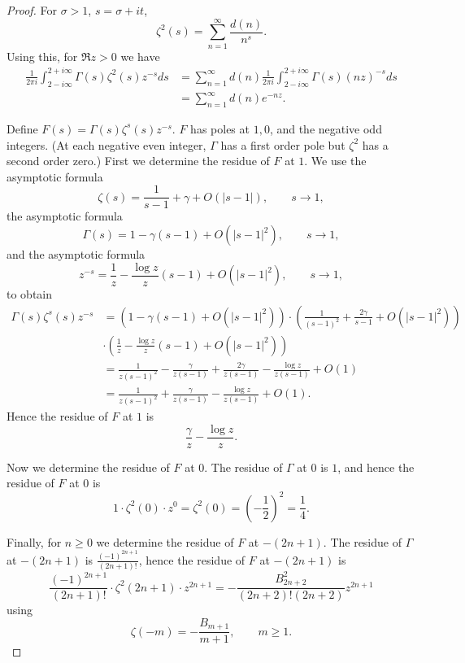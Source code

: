 \documentclass{article}
\begin{document}
\begin{proof}
For $\sigma>1$, $s=\sigma+it$,
\[
\zeta^2(s) = \sum_{n=1}^\infty \frac{d(n)}{n^s}.
\]
Using this, for
 $\Re z>0$ we have
\begin{align}
\frac{1}{2\pi i}\int_{2-i\infty}^{2+i\infty}
\Gamma(s) \zeta^2(s) z^{-s} ds & = \sum_{n=1}^\infty d(n) \frac{1}{2\pi i} \int_{2-i\infty}^{2+i\infty}
\Gamma(s) (nz)^{-s} ds
\nonumber \\
& = \sum_{n=1}^\infty d(n) e^{-nz}.
\label{mellin}
\end{align}

Define $F(s) = \Gamma(s) \zeta^s(s) z^{-s}$. $F$ has poles at
$1,0$, and the negative odd integers. (At each negative even integer, $\Gamma$ has a first order pole but $\zeta^2$ has a second order
zero.) First we determine the residue of $F$ at $1$.
We use the asymptotic formula
\[
\zeta(s) = \frac{1}{s-1}+\gamma+O(|s-1|), \qquad s \to 1,
\]
the asymptotic formula
\[
\Gamma(s)=1-\gamma(s-1)+O(|s-1|^2), \qquad s \to 1,
\]
and  the asymptotic formula
\[
z^{-s} = \frac{1}{z}-\frac{\log z}{z} (s-1)+O(|s-1|^2), \qquad  s \to 1,
\]
to obtain
\begin{align*}
 \Gamma(s) \zeta^s(s) z^{-s} &=(1-\gamma(s-1)+O(|s-1|^2)  )
\cdot \left(\frac{1}{(s-1)^2}+\frac{2\gamma}{s-1}+O(|s-1|^2)\right)\\
&\cdot \left( \frac{1}{z}-\frac{\log z}{z} (s-1)+O(|s-1|^2) \right)\\
&=\frac{1}{z(s-1)^2}
-\frac{\gamma}{z(s-1)}+\frac{2\gamma}{z(s-1)}-\frac{\log z}{z(s-1)}+O(1)\\
&=\frac{1}{z(s-1)^2}+\frac{\gamma}{z(s-1)}-\frac{\log z}{z(s-1)}+O(1).
\end{align*}
Hence the residue of $F$ at $1$ is 
\[
\frac{\gamma}{z}-\frac{\log z}{z}.
\]

Now we determine the residue of $F$ at $0$. The residue of $\Gamma$ at $0$ is $1$, and 
hence the residue of $F$ at $0$ is 
\[
1 \cdot \zeta^2(0) \cdot z^0 = \zeta^2(0) = \left( -\frac{1}{2} \right)^2 = \frac{1}{4}.
\]

Finally, for $n \geq 0$ we determine the residue of $F$ at $-(2n+1)$. The residue of $\Gamma$ at $-(2n+1)$ is
$\frac{(-1)^{2n+1}}{(2n+1)!}$, hence the residue of $F$ at $-(2n+1)$ is
\[
\frac{(-1)^{2n+1}}{(2n+1)!} \cdot \zeta^2(2n+1) \cdot z^{2n+1} = 
-\frac{B_{2n+2}^2}{(2n+2)!(2n+2)} z^{2n+1}
\]  
using 
\[
\zeta(-m) = -\frac{B_{m+1}}{m+1}, \qquad m \geq 1.
\]



\end{proof}
\end{document}
